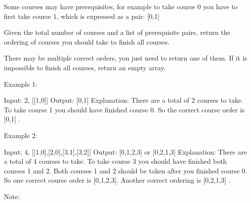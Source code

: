 Some courses may have prerequisites, for example to take course 0 you have to first take course 1, which is expressed as a pair: [0,1]

Given the total number of courses and a list of prerequisite pairs, return the ordering of courses you should take to finish all courses.

There may be multiple correct orders, you just need to return one of them. If it is impossible to finish all courses, return an empty array.

Example 1:

Input: 2, [[1,0]] 
Output: [0,1]
Explanation: There are a total of 2 courses to take. To take course 1 you should have finished   
             course 0. So the correct course order is [0,1] .

Example 2:

Input: 4, [[1,0],[2,0],[3,1],[3,2]]
Output: [0,1,2,3] or [0,2,1,3]
Explanation: There are a total of 4 courses to take. To take course 3 you should have finished both     
             courses 1 and 2. Both courses 1 and 2 should be taken after you finished course 0. 
             So one correct course order is [0,1,2,3]. Another correct ordering is [0,2,1,3] .

Note:

